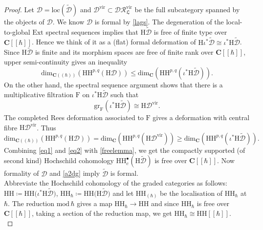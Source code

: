 \documentclass[10pt,a4paper]{amsart}
\newcommand{\C}{\mathbf C}
\newcommand{\brak}{[\![\hbar]\!]}
\newcommand{\cbrak}{(\!(\hbar)\!)}
\newcommand{\mr}{\mathrm}
\begin{document}
\begin{proof}
Let $\mathcal{D}=\mr{loc}\left(\widetilde{\mathcal{D}}\right)$ and $\mathcal{D}^\mr{vir}\subset \mathcal{DR}^{\mr{vir}}_\mathfrak{L}$ be the full subcategory spanned by the objects of $\mathcal{D}$. We know $\mathcal{D}$ is formal by \cref{lags}. The degeneration of the local-to-global $\mr{Ext}$ spectral sequences implies that $\mr{H}\widetilde{\mathcal{D}}$ is free of finite type over $\C\brak$. Hence we think of it as a (flat) formal deformation of $\mr{H}\iota^*\widetilde{\mathcal{D}}\cong \iota^*\mr{H}\widetilde{\mathcal{D}}$. Since $\mr{H}\widetilde{\mathcal{D}}$ is finite and its morphism spaces are free of finite rank over $\C\brak$, upper semi-continuity gives an inequality \begin{equation}\label{eq1}\mr{dim}_{\C\cbrak}\left(\mr{HH}^{p,q}\left(\mr{H}\mathcal{D}\right)\right)\le \mr{dim}_{\C}\left(\mr{HH}^{p,q}\left(\iota^*\mr{H}\widetilde{\mathcal{D}}\right)\right).\end{equation} On the other hand, the spectral sequence argument shows that there is a multiplicative filtration $\mr{F}$ on $\iota^*\mr{H}\widetilde{\mathcal{D}}$ such that $$\mr{gr}_\mr{F}\left(\iota^*\mr{H}\widetilde{\mathcal{D}}\right) \cong  \mr{H}\mathcal{D}^\mr{vir}.$$ The completed Rees deformation associated to $\mr{F}$ gives a deformation with central fibre $\mr{H}\mathcal{D}^{\mr{vir}}$. Thus
\begin{equation}\label{eq2}\mr{dim}_{\C\cbrak}\left(\mr{HH}^{p,q}\left(\mr{H}\mathcal{D}\right)\right)=\mr{dim}_{\C}\left(\mr{HH}^{p,q}\left(\mr{H}\mathcal{D}^\mr{vir}\right)\right)\ge \mr{dim}_{\C}\left(\mr{HH}^{p,q}\left(\iota^*\mr{H}\widetilde{\mathcal{D}}\right)\right).\end{equation}
Combining \eqref{eq1} and \eqref{eq2} with \cref{freelemma}, we get the compactly supported (of second kind) Hochschild cohomology $\mr{HH}_c^\bullet\left(\mr{H}\widetilde{\mathcal{D}}\right)$ is free over $\C\brak$. Now formality of $\mathcal{D}$ and \cref{a2dg} imply $\widetilde{\mathcal{D}}$ is formal.\\
Abbreviate the Hochschild cohomology of the graded categories as follows: $\mr{HH} \coloneqq \mr{HH}\big(\iota^*\mr{H}\widetilde{\mathcal{D}}\big)$, $\mr{HH}_{\hbar} \coloneqq \mr{HH}\big(\mr{H}\widetilde{\mathcal{D}}\big)$ and let $\mr{HH}_{(\hbar)}$ be the localisation of $\mr{HH}_\hbar$ at $\hbar$. The reduction $\mr{mod}\,\hbar$ gives a map $\mr{HH}_{\hbar} \to \mr{HH}$ and since $\mr{HH}_\hbar$ is free over $\C\brak$, taking a section of the reduction map, we get $\mr{HH}_\hbar \cong \mr{HH}\brak$.\\

\end{proof}
\end{document}
